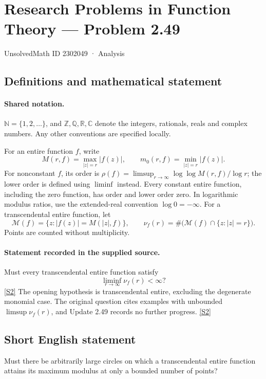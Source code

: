 \documentclass[11pt]{article}
\newcommand{\sref}[2]{\hyperlink{source:#1:#2}{[S#2]}}
\begin{document}
\setcounter{section}{2302048}
\section{Research Problems in Function Theory — Problem 2.49}\label{2302049}
{\small\sffamily UnsolvedMath ID 2302049 · Analysis}
\subsection{Definitions and mathematical statement}

\paragraph{Shared notation.}$\mathbb N=\{1,2,\ldots\}$, and $\mathbb Z,\mathbb Q,\mathbb R,\mathbb C$ denote the integers, rationals, reals and complex numbers. Any other conventions are specified locally.


For an entire function $f$, write
\[
 M(r,f)=\max_{|z|=r}|f(z)|,\qquad m_0(r,f)=\min_{|z|=r}|f(z)|.
\]
For nonconstant $f$, its order is $\rho(f)=\limsup_{r\to\infty}\log\log M(r,f)/\log r$;
the lower order is defined using $\liminf$ instead. Every constant entire function, including the zero function, has order and lower order zero. In logarithmic modulus ratios, use the extended-real convention $\log0=-\infty$.
For a transcendental entire function, let
\[\mathcal M(f)=\{z:|f(z)|=M(|z|,f)\},\qquad
\nu_f(r)=\#\bigl(\mathcal M(f)\cap\{z:|z|=r\}\bigr).
\]
Points are counted without multiplicity.

\paragraph{Statement recorded in the supplied source.}
Must every transcendental entire function satisfy
\[\liminf_{r\to\infty}\nu_f(r)<\infty?\] \sref{2302049}{2}
The opening hypothesis is transcendental entire, excluding the degenerate monomial case. The original question cites examples with unbounded $\limsup\nu_f(r)$, and Update 2.49 records no further progress. \sref{2302049}{2}
\subsection{Short English statement}
Must there be arbitrarily large circles on which a transcendental entire function attains its maximum modulus at only a bounded number of points?
\end{document}
